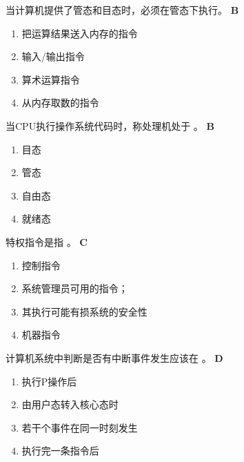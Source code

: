 \begin{problem}
	当计算机提供了管态和目态时，\myline 必须在管态下执行。
	\textbf{B}
	\vspace{-0.5em}
	\begin{multicols}{2}
		\begin{enumerate}[label=\Alph*.]
			\item 把运算结果送入内存的指令
			\item 输入/输出指令
			\item 算术运算指令
			\item 从内存取数的指令
		\end{enumerate}
	\end{multicols}
	\vspace{-1em}
\end{problem}



\begin{problem}
    当CPU执行操作系统代码时，称处理机处于 \myline。
	\textbf{B}
	\vspace{-0.5em}
	\begin{multicols}{4}
		\begin{enumerate}[label=\Alph*.]
			\item 目态
			\item 管态
			\item 自由态
			\item 就绪态
		\end{enumerate}
	\end{multicols}
	\vspace{-1em}
\end{problem}



\begin{problem}
	特权指令是指 \myline。
	\textbf{C}
	\vspace{-0.5em}
	\begin{multicols}{2}
		\begin{enumerate}[label=\Alph*.]
			\item 控制指令
			\item 系统管理员可用的指令；
			\item 其执行可能有损系统的安全性
			\item 机器指令
		\end{enumerate}
	\end{multicols}
	\vspace{-1em}
\end{problem}


\begin{problem}
	计算机系统中判断是否有中断事件发生应该在 \myline。
	\textbf{D}
	\vspace{-0.5em}
	\begin{multicols}{2}
		\begin{enumerate}[label=\Alph*.]
			\item 执行P操作后
			\item 由用户态转入核心态时
			\item 若干个事件在同一时刻发生
			\item 执行完一条指令后
		\end{enumerate}
	\end{multicols}
	\vspace{-1em}
\end{problem}